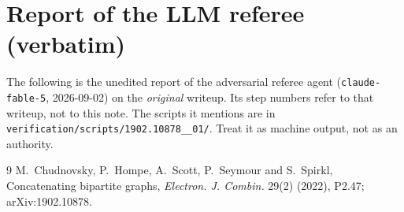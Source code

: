 \documentclass[11pt,a4paper]{article}
\theoremstyle{plain}
\theoremstyle{definition}
\theoremstyle{remark}
\begin{document}
\section{Report of the LLM referee (verbatim)}\label{app:referee}

\begin{tcolorbox}[colback=gray!8,colframe=gray!50,boxrule=0.4pt,arc=2pt]
\small The following is the unedited report of the adversarial referee agent (\texttt{claude-fable-5}, 2026-09-02) on the \emph{original} writeup. Its step numbers refer to that writeup, not to this note. The scripts it mentions are in \texttt{verification/scripts/1902.10878\_\_01/}. Treat it as machine output, not as an authority.
\end{tcolorbox}



\begin{thebibliography}{9}
 M.~Chudnovsky, P.~Hompe, A.~Scott, P.~Seymour and S.~Spirkl, Concatenating bipartite graphs, \emph{Electron. J. Combin.} 29(2) (2022), P2.47; arXiv:1902.10878.
\end{thebibliography}
\end{document}
